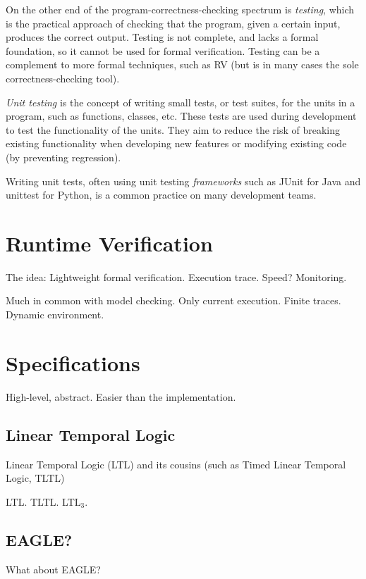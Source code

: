 \documentclass[a4paper,11pt]{kth-mag}
\begin{document}
On the other end of the program-correctness-checking spectrum is \emph{testing}, which is the
practical approach of checking that the program, given a certain input, produces the correct output.
Testing is not complete, and lacks a formal foundation, so it cannot be used for formal verification. 
Testing can be a complement to more formal techniques, such as RV (but is in many cases the sole correctness-checking tool).

\textit{Unit testing} is the concept of writing small tests, or test suites, for the units in
a program, such as functions, classes, etc. These tests are used during development to test the 
functionality of the units. They aim to reduce the risk of breaking existing functionality when 
developing new features or modifying existing code (by preventing regression).

Writing unit tests, often using unit testing \textit{frameworks} such as JUnit \cite{junit}
for Java and unittest \cite{python-unittest} for Python, is a common practice on many
development teams.

\section{Runtime Verification}

The idea: Lightweight formal verification. Execution trace. Speed? Monitoring.

Much in common with model checking. Only current execution. Finite traces. Dynamic environment. 

\section{Specifications}

High-level, abstract. Easier than the implementation.

\subsection{Linear Temporal Logic}

Linear Temporal Logic (LTL) and its cousins (such as Timed Linear Temporal Logic, TLTL)

LTL. TLTL. LTL$_{3}$.

\subsection{EAGLE?}

What about EAGLE?
\end{document}
